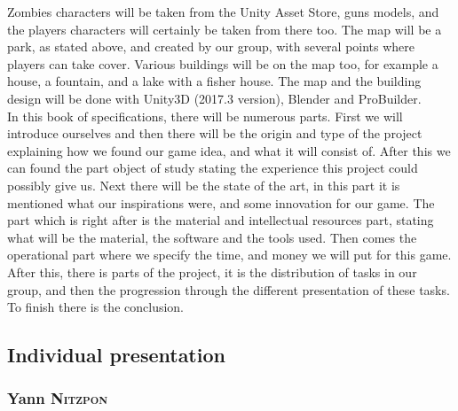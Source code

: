 \documentclass[12pt]{article}
\begin{document}
Zombies characters will be taken from the Unity Asset Store, guns models, and the players characters will certainly be taken from there too. The map will be a park, as stated above, and created by our group, with several points where players can take cover. Various buildings will be on the map too, for example a house, a fountain, and a lake with a fisher house. The map and the building design will be done with Unity3D (2017.3 version), Blender and ProBuilder.\\

In this book of specifications, there will be numerous parts. First we will introduce ourselves and then there will be the origin and type of the project explaining how we found our game idea, and what it will consist of. After this we can found the part object of study stating the experience this project could possibly give us. Next there will be the state of the art, in this part it is mentioned what our inspirations were, and some innovation for our game. The part which is right after is the material and intellectual resources part, stating what will be the material, the software and the tools used. Then comes the operational part where we specify the time, and money we will put for this game. After this, there is parts of the project, it is the distribution of tasks in our group, and then the progression through the different presentation of these tasks. To finish there is the conclusion.
\bigskip

\subsection{Individual presentation}
	\subsubsection{Yann \textsc{Nitzpon}}
    
\end{document}
